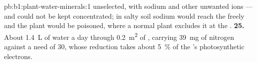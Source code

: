 \begin{solution}{pb:b1:plant-water-minerals:1}
unselected, with sodium and other unwanted ions --- and could not be
kept concentrated; in salty soil sodium would reach the  freely
and the plant would be poisoned, where a normal plant excludes it at
the .
\textbf{25.} About \qty{1.4}{L} of water a day through \qty{0.2}{m^2}
of , carrying \qty{39}{mg} of nitrogen against a need of
\qty{30}{}, whose reduction takes about \qty{5}{\%} of the 's
photosynthetic electrons.
\end{solution}
